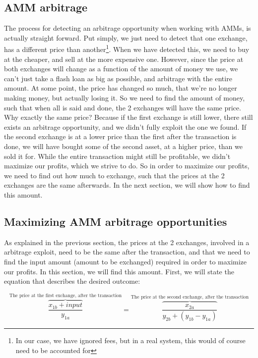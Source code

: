 \subsection{AMM arbitrage}
The process for detecting an arbitrage opportunity when working with AMMs, is
actually straight forward. Put simply, we just need to detect that one exchange, has
a different price than another\footnote{In our case, we have ignored fees, but
in a real system, this would of course need to be accounted for}. When we have
detected this, we need to buy at the cheaper, and sell at the more
expensive one. However, since the price at both exchanges will change
as a function of the amount of money we use, we can't just take a
flash loan as big as possible, and arbitrage
with the entire amount. At some point, the price has changed so much, that we're
no longer making money, but actually losing it. So we need to find the amount of
money, such that when all is said and done, the 2 exchanges will have the same
price. Why exactly the same price? Because if the first exchange is still
lower, there still exists an arbitrage opportunity, and we didn't fully exploit
the one we found. If the second exchange is at a
lower price than the first after the transaction is done, we will have
bought some of the second asset, at a
higher price, than we sold it for. While the entire transaction might
still be profitable, we didn't
maximize our profits, which we strive to do. So in order to maximize our
profits, we need to find out how much to exchange, such that the prices at the 2
exchanges are the same afterwards. In the next section, we will show how to find
this amount.

\subsection{Maximizing AMM arbitrage opportunities}\label{maximizing}
As explained in the previous section, the prices at the 2
exchanges, involved in a arbitrage exploit, need to be the same after the
transaction, and that we need to find the input amount (amount to be
exchanged) required in order to
maximize our profits. In this section, we will find this amount. First, we will
state the equation that describes the desired outcome:

\begin{equation}
\overbrace{\frac{x_{1b} + input}{y_{1a}}}^{\text{The price at the
    first exchange, after the transaction}} = \overbrace{\frac{x_{2a}}{y_{2b} + (y_{1b} - y_{1a})}}^{\text{The price at the
    second exchange, after the transaction}}
\end{equation}


